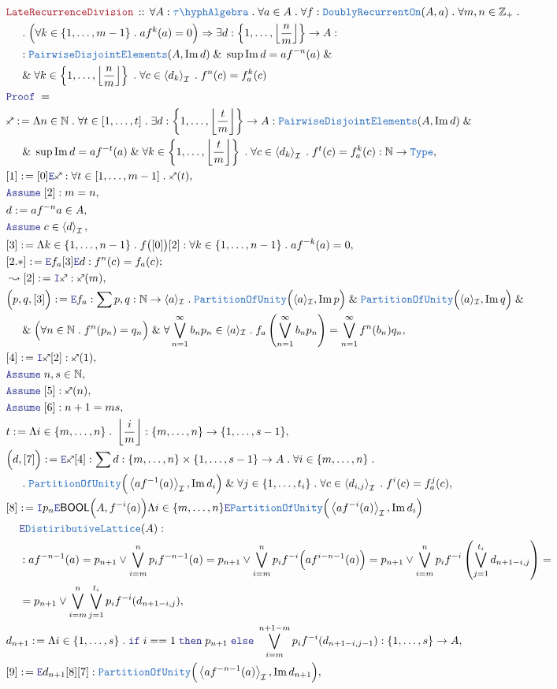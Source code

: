 \documentclass[12pt]{scrartcl}
\newcommand{\TYPE}[1]{\textcolor{NavyBlue}{\mathtt{#1}}}
\newcommand{\LOGIC}[1]{\textcolor{Blue}{\mathtt{#1}}}
\newcommand{\THM}[1]{\textcolor{Maroon}{\mathtt{#1}}}
\renewcommand{\.}{\; . \;}
\newcommand{\de}{: \kern 0.1pc =}
\newcommand{\If}{\LOGIC{if} \;}
\newcommand{\Then}{ \; \LOGIC{then} \;}
\newcommand{\Else}{\; \LOGIC{else} \;}
\newcommand{\Theorem}[2]{& \THM{#1} \, :: \, #2 \\ & \Proof = \\ }
\newcommand{\NewLine}{\\ & \kern 1pc}
\newcommand{\Page}[1]{ \begin{align*} #1 \end{align*}   }
\renewcommand{\And}{\; \& \;}
\newcommand{\Imply}{\Rightarrow}
\newcommand{\Intro}{\LOGIC{I}}
\newcommand{\Elim}{\LOGIC{E}}
\newcommand{\Type}{\TYPE{Type}}
\newcommand{\Int}{\mathbb{Z} }
\newcommand{\Nat}{\mathbb{N} }
\DeclareMathOperator*{\im}{Im}
\newcommand{\Say}[3]{& #1 \de #2 : #3, \\}
\newcommand{\SayIn}[3]{& #1 \de #2 \in #3, \\}
\newcommand{\Conclude}[3]{& #1 \de #2 : #3; \\}
\newcommand{\Derive}[3]{& \leadsto #1 \de #2 : #3, \\}
\newcommand{\Assume}[2]{& \LOGIC{Assume} \; #1 : #2, \\}
\newcommand{\AssumeIn}[2]{& \LOGIC{Assume} \; #1 \in #2, \\}
\newcommand{\Proof}{\LOGIC{Proof} \; }
\newcommand{\genIdeal}[1]{\left\langle #1 \right\rangle_\mathcal{I}}
\newcommand{\I}{\mathcal{I}}
\newcommand{\PD}{\TYPE{PairwiseDisjointElements}}
\newcommand{\PoU}{\TYPE{PartitionOfUnity}}
\newcommand{\TAlgebra}{\TYPE{\tau\hyph Algebra}}
\newcommand{\BOOL}{\mathsf{BOOL}}
\begin{document}
\Page{
		\Theorem{LateRecurrenceDivision}
	{
		\forall A : \TAlgebra \.
		\forall a \in A \. 
		\forall f : \TYPE{DoublyRecurrentOn}(A,a) \.
		\forall m,n \in \Int_+ \.
		\NewLine \.
		\Big(
			\forall k \in \{1,\ldots,m-1\} \.
			af^{k}(a) = 0
		\Big)
		\Imply
		\exists d : \left\{ 1, 
			\ldots,  
			\left\lfloor \frac{n}{m} \right\rfloor 
		\right\} \to  A : \NewLine :
		\PD(A,\im d) 
		\And
		\sup \im d = a f^{-n}(a)
		\And \NewLine \And 
		\forall k \in \left\{ 1, \ldots,  \left\lfloor \frac{n}{m} \right\rfloor \right\} \.
		\forall c \in \genIdeal{d_k} \.
		f^n(c) = f^k_a(c)
	}
	\Say{\sagittarius}
	{
		\Lambda n \in \Nat \.
		\forall t \in [1,\ldots,t] \.
		\exists d : \left\{ 1, 
			\ldots,  
			\left\lfloor \frac{t}{m} \right\rfloor 
		\right\} \to  A : 
		\PD(A,\im d) 
		\And \NewLine \And
		\sup \im d = a f^{-t}(a)
		\And 
		\forall k \in \left\{ 1, \ldots,  \left\lfloor \frac{t}{m} \right\rfloor \right\} \.
		\forall c \in \genIdeal{d_k} \.
		f^t(c) = f^k_a(c)
	}{   \Nat \to \Type}
	\Say{[1]}{[0]\Elim \sagittarius}
	{
		\forall t \in [1,\ldots,m-1] \. \sagittarius(t) 
	}
	\Assume{[2]}{m = n}
	\SayIn{d}{af^{-n}a}{A}
	\AssumeIn{c}{\genIdeal{d}}
	\Say{[3]}{\Lambda k \in \{1,\ldots,n-1\} \. f\big([0]\big)[2]}
	{
		\forall k \in \{1,\ldots,n-1\} \.   af^{-k}(a) = 0
	}
	\Conclude{[2.*]}{\Elim f_a [3] \Elim d}{f^n(c) = f_a(c)}	
	\Derive{[2]}{\Intro \sagittarius}{\sagittarius(m)}
	\Say{\Big(p,q,[3] \Big)}{\Elim f_a}
	{
		\sum p,q : \Nat \to \langle a \rangle_\I \.
		\PoU\Big(\langle a \rangle_\I,\im p\Big)
		\And
		\PoU\Big(\langle a \rangle_\I,\im q\Big)
		\And \NewLine \And
		\Big(\forall n \in \Nat \. f^n(p_n) = q_n \Big)
		\And 
		\forall \bigvee^\infty_{n=1} b_n p_n  \in \langle a \rangle_\I\.
		f_a\left( \bigvee^\infty_{n=1} b_n p_n \right) = \bigvee^\infty_{n=1} f^n(b_n) q_n
	}
	\Say{[4]}{\Intro \sagittarius [2]}{\sagittarius(1)}
	\AssumeIn{n,s}{\Nat}
	\Assume{[5]}{\sagittarius(n)}
	\Assume{[6]}{n + 1 = ms}
	\Say{t}{\Lambda i \in \{m,\ldots,n\} \. \left\lfloor \frac{i}{m} \right\rfloor}
	{ \{m,\ldots,n\} \to \{1,\ldots,s-1\}  }
	\Say{\Big(d,[7]\Big)}{\Elim \sagittarius[4]}
	{
		\sum d : \{m,\ldots,n\} \times \{1,\ldots, s-1\} \to A \.
		\forall i \in \{m,\ldots,n\} \. \NewLine \.
		\PoU\Big( \genIdeal{af^{-1}(a)}, \im d_i \Big)
		\And 
		\forall j \in \{1,\ldots,t_i\} \.
		\forall c \in \genIdeal{d_{i,j}} \.
		f^i(c) = f^j_a(c)
	}
	\Say{[8]}{ 
		\Intro p_n \Elim \BOOL\Big(A, f^{-i}(a) \Big)
		\Lambda i \in \{m,\ldots, n\}
		\Elim \PoU \Big( \genIdeal{af^{-i}(a)}, \im d_i \Big) \NewLine
		\Elim \TYPE{DistiributiveLattice}(A)
	} 
	{
		\NewLine :		
		a f^{-n-1}(a) = 
		p_{n+1} \vee \bigvee^{n}_{i=m} p_i f^{-n-1}(a) =
		p_{n+1} \vee \bigvee^{n}_{i=m} p_i f^{-i}\Big( a f^{i-n-1}(a) \Big) =
		p_{n+1}  \vee  \bigvee^{n}_{i=m} p_i f^{-i}
		\left( \bigvee^{t_i}_{j=1} d_{n+1-i,j} \right) =
		\NewLine =
		p_{n+1} \vee \bigvee^{n}_{i=m} \bigvee^{t_i}_{j=1} p_i f^{-i}(d_{n +1-i,j})
	}
	\Say{d_{n+1}}{
		\Lambda i \in \{1,\ldots,s\} \.
		\If i == 1 \Then p_{n+1} \Else
		\bigvee_{i=m}^{n + 1 - m} p_i f^{-i}(d_{n+1-i,j-1}) 
	}
	{
		\{1,\ldots,s\} \to A
	}
	\Say{[9]}{\Elim d_{n+1} [8][7]}{\PoU\Big( \genIdeal{af^{-n-1}(a)}, \im d_{n+1} \Big)}
}
\end{document}
